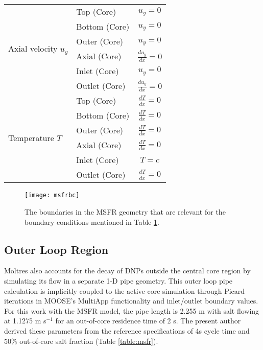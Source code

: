 \begin{table}[htbp!]
\begin{tabular}{ l l c}
        \midrule
        \multirow{6}{*}{Axial velocity $u_y$} & Top (Core) & $u_y = 0$ \\
        & Bottom (Core) & $u_y = 0$ \\
        & Outer (Core) & $u_y = 0$ \\
        & Axial (Core) & $\frac{d u_y}{dx} = 0$ \\[.5ex]
        & Inlet (Core) & $u_y = 0$ \\
        & Outlet (Core) & $\frac{d u_y}{dx} = 0$ \\[.5ex]
        \midrule
        \multirow{6}{*}{Temperature $T$} & Top (Core) &
        $\frac{d T}{dx} = 0$ \\[.5ex]
        & Bottom (Core) & $\frac{d T}{dx} = 0$ \\[.5ex]
        & Outer (Core) & $\frac{d T}{dx} = 0$ \\[.5ex]
        & Axial (Core) & $\frac{d T}{dx} = 0$ \\[.5ex]
        & Inlet (Core) & $T = c$ \\
        & Outlet (Core) & $\frac{d T}{dx} = 0$ \\[.5ex]
		\bottomrule
	\end{tabular}
	\label{table:corebc}
\end{table}

\clearpage

\begin{figure}[htb!]
    \centering
    \texttt{[image: msfrbc]}
    \caption{The boundaries in the \gls{MSFR} geometry that are relevant for
    the boundary conditions mentioned in Table \ref{table:corebc}.}
    \label{fig:msfrbc}
\end{figure}

\subsection{Outer Loop Region}

Moltres also accounts for the decay of
\glspl{DNP} outside the central core region by simulating its flow in a
separate 1-D pipe geometry. This outer loop pipe calculation is implicitly
coupled to the active core simulation through Picard iterations in MOOSE's
MultiApp functionality and inlet/outlet boundary values. For this work with
the \gls{MSFR} model, the pipe length is 2.255 m with salt flowing at 1.1275 m
s$^{-1}$ for an out-of-core residence time of 2 s. The present author derived
these parameters from the reference specifications of 4s cycle
time and 50\% out-of-core salt fraction (Table \ref{table:msfr}).

